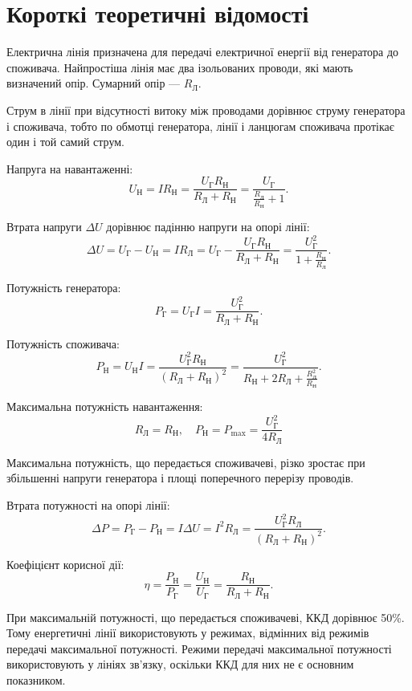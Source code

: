 \documentclass[a4paper,oneside,DIV=10,12pt]{scrartcl}
\begin{document}
	\section{Короткі теоретичні відомості}
		Електрична лінія призначена для передачі електричної енергії від генератора до споживача. Найпростіша лінія має два ізольованих проводи, які мають визначений опір. Сумарний опір — $R_{\text{Л}}$.
		
		Струм в лінії при відсутності витоку між проводами дорівнює струму генератора і споживача, тобто по обмотці генератора, лінії і ланцюгам споживача протікає один і той самий струм.
		
		Напруга на навантаженні:
		\[
			U_{\text{Н}} = IR_{\text{Н}} = \frac{U_{\text{Г}}R_{\text{Н}}}{R_{\text{Л}} + R_{\text{Н}}} = \frac{U_{\text{Г}}}{\frac{R_{\text{Л}}}{R_{\text{Н}}} + 1}.
		\]
		
		Втрата напруги $\Delta U$ дорівнює падінню напруги на опорі лінії:
		\[
			\Delta U = U_{\text{Г}} - U_{\text{Н}} = I R_{\text{Л}} = U_{\text{Г}} - \frac{U_{\text{Г}} R_{\text{Н}}}{R_{\text{Л}} + R_{\text{Н}}} = \frac{U^2_{\text{Г}}}{1 + \frac{R_{\text{Н}}}{R_{\text{Л}}}}.
		\]
		
		Потужність генератора:
		\[
			P_{\text{Г}} = U_{\text{Г}} I = \frac{U^2_{\text{Г}}}{R_{\text{Л}} + R_{\text{Н}}}.
		\]
		
		Потужність споживача:
		\[
			P_{\text{Н}} = U_\text{Н} I = \frac{U^2_{\text{Г}} R_{\text{Н}}}{\left( R_{\text{Л}} + R_{\text{Н}} \right)^2} = \frac{U^2_{\text{Г}}}{R_{\text{Н}} + 2R_{\text{Л}}+ \frac{R^2_{\text{Л}}}{R_{\text{Н}}}}.
		\]
		
		Максимальна потужність навантаження:
		\[
			R_{\text{Л}} = R_{\text{Н}}, \quad P_{\text{Н}} = P_{\text{max}} = \frac{U^2_{\text{Г}}}{4 R_{\text{Л}}}
		\]
		
		Максимальна потужність, що передається споживачеві, різко зростає при збільшенні напруги генератора і площі поперечного перерізу проводів.
		
		Втрата потужності на опорі лінії:
		\[
			\Delta P = P_{\text{Г}} - P_{\text{Н}} = I \Delta U = I^2 R_{\text{Л}} = \frac{U^2_{\text{Г}}R_{\text{Л}}}{\left(R_{\text{Л}} + R_{\text{Н}} \right)^2}.
		\]
		
		Коефіцієнт корисної дії:
		\[
			\eta = \frac{P_{\text{Н}}}{P_{\text{Г}}} = \frac{U_{\text{Н}}}{U_{\text{Г}}} = \frac{R_{\text{Н}}}{R_{\text{Л}} + R_{\text{Н}}}.
		\]
		
		При максимальній потужності, що передається споживачеві, ККД дорівнює 50\%. Тому енергетичні лінії використовують у режимах, відмінних від режимів передачі максимальної потужності. Режими передачі максимальної потужності використовують у лініях зв'язку, оскільки ККД для них не є основним показником.
		
\end{document}
